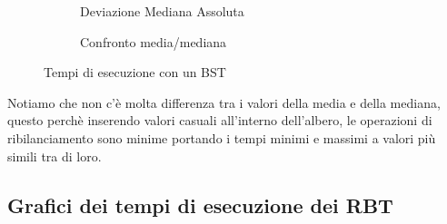 \documentclass[a4paper,titlepage]{article}
\begin{document}
\begin{figure}[h]
  \centering
  \begin{subfigure}{\textwidth}
     \captionsetup{justification=centering}
     \caption{Deviazione Mediana Assoluta}
     \label{fig:bst_mad}
  \end{subfigure}%
  \vspace{2pt}
  \begin{subfigure}{\textwidth}
     \captionsetup{justification=centering}
     \caption{Confronto media/mediana}
     \label{fig:bst_mean_median}
  \end{subfigure}
  \caption{Tempi di esecuzione con un BST}
\end{figure}

Notiamo che non c'è molta differenza tra i valori della media e della mediana, questo perchè inserendo valori casuali all'interno dell'albero, le operazioni di ribilanciamento sono minime portando i tempi minimi e massimi a valori più simili tra di loro.
\newpage

\subsection{Grafici dei tempi di esecuzione dei RBT }
\end{document}
